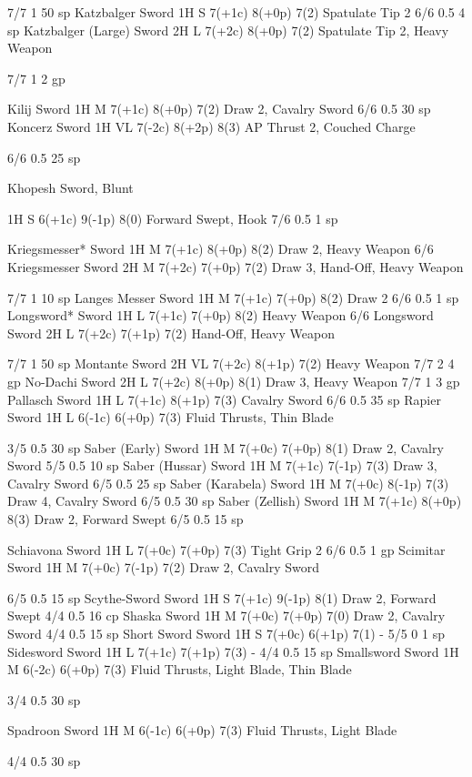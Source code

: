 \documentclass[oneside,11pt,english]{book}
\begin{document}
7/7 1 50 
sp 
Katzbalger Sword 1H S 7(+1c) 8(+0p) 7(2) Spatulate Tip 2 6/6 0.5 4 sp 
Katzbalger (Large) Sword 2H L 7(+2c) 8(+0p) 7(2) Spatulate Tip 2, Heavy 
Weapon 

7/7 1 2 gp 

Kilij Sword 1H M 7(+1c) 8(+0p) 7(2) Draw 2, Cavalry Sword 6/6 0.5 30 
sp 
Koncerz Sword 1H VL 7(-2c) 8(+2p) 8(3) AP Thrust 2, Couched 
Charge 

6/6 0.5 25 
sp 

Khopesh Sword, 
Blunt 

1H S 6(+1c) 9(-1p) 8(0) Forward Swept, Hook 7/6 0.5 1 sp 

Kriegsmesser* Sword 1H M 7(+1c) 8(+0p) 8(2) Draw 2, Heavy Weapon 6/6 
Kriegsmesser Sword 2H M 7(+2c) 7(+0p) 7(2) Draw 3, Hand-Off, 
Heavy Weapon 

7/7 1 10 
sp 
Langes Messer Sword 1H M 7(+1c) 7(+0p) 8(2) Draw 2 6/6 0.5 1 sp 
Longsword* Sword 1H L 7(+1c) 7(+0p) 8(2) Heavy Weapon 6/6 
Longsword Sword 2H L 7(+2c) 7(+1p) 7(2) Hand-Off, Heavy 
Weapon 

7/7 1 50 
sp 
Montante Sword 2H VL 7(+2c) 8(+1p) 7(2) Heavy Weapon 7/7 2 4 gp 
No-Dachi Sword 2H L 7(+2c) 8(+0p) 8(1) Draw 3, Heavy Weapon 7/7 1 3 gp 
Pallasch Sword 1H L 7(+1c) 8(+1p) 7(3) Cavalry Sword 6/6 0.5 35 
sp 
Rapier Sword 1H L 6(-1c) 6(+0p) 7(3) Fluid Thrusts, Thin 
Blade 

3/5 0.5 30 
sp 
Saber (Early) Sword 1H M 7(+0c) 7(+0p) 8(1) Draw 2, Cavalry Sword 5/5 0.5 10 
sp 
Saber (Hussar) Sword 1H M 7(+1c) 7(-1p) 7(3) Draw 3, Cavalry Sword 6/5 0.5 25 
sp 
Saber (Karabela) Sword 1H M 7(+0c) 8(-1p) 7(3) Draw 4, Cavalry Sword 6/5 0.5 30 
sp 
Saber (Zellish) Sword 1H M 7(+1c) 8(+0p) 8(3) Draw 2, Forward Swept 6/5 0.5 15 
sp 


Schiavona Sword 1H L 7(+0c) 7(+0p) 7(3) Tight Grip 2 6/6 0.5 1 gp 
Scimitar Sword 1H M 7(+0c) 7(-1p) 7(2) Draw 2, 
Cavalry Sword 

6/5 0.5 15 
sp 
Scythe-Sword Sword 1H S 7(+1c) 9(-1p) 8(1) Draw 2, Forward Swept 4/4 0.5 16 
cp 
Shaska Sword 1H M 7(+0c) 7(+0p) 7(0) Draw 2, Cavalry Sword 4/4 0.5 15 
sp 
Short Sword Sword 1H S 7(+0c) 6(+1p) 7(1) - 5/5 0 1 sp 
Sidesword Sword 1H L 7(+1c) 7(+1p) 7(3) - 4/4 0.5 15 
sp 
Smallsword Sword 1H M 6(-2c) 6(+0p) 7(3) Fluid Thrusts, Light 
Blade, Thin Blade 

3/4 0.5 30 
sp 

Spadroon Sword 1H M 6(-1c) 6(+0p) 7(3) Fluid Thrusts, Light 
Blade 

4/4 0.5 30 
sp 
\end{document}
